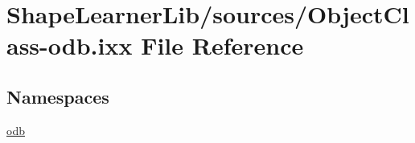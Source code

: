 \hypertarget{_object_class-odb_8ixx}{}\section{Shape\+Learner\+Lib/sources/\+Object\+Class-\/odb.ixx File Reference}
\label{_object_class-odb_8ixx}
\subsection*{Namespaces}
\begin{DoxyCompactItemize}
\item 
 \hyperlink{namespaceodb}{odb}
\end{DoxyCompactItemize}
